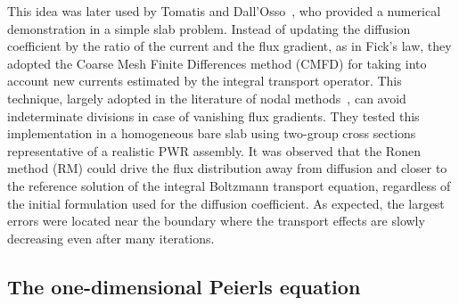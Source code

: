 This idea was later used by Tomatis and Dall'Osso~\cite{Tomatis-2011}, who provided a numerical demonstration in a simple slab problem. Instead of updating the diffusion coefficient by the ratio of the current and the flux gradient, as in Fick's law, they adopted the Coarse Mesh Finite Differences method (CMFD) for taking into account \DIFdelbegin {}\DIFdelend \DIFaddbegin {}\DIFaddend new currents estimated by the integral transport operator\DIFdelbegin {}\DIFdelend . 
%
%
This technique, largely adopted in the literature of nodal methods~\cite{Smith-1983,Lawrence-1986}, can avoid indeterminate divisions in case of vanishing flux gradients. They tested this implementation in a homogeneous bare slab using two-group cross sections representative of a realistic PWR assembly. It was observed that the Ronen method (RM) could drive the flux distribution away from diffusion and closer to the reference solution of the integral Boltzmann transport equation, regardless of the initial formulation used for the diffusion coefficient. As expected, the largest errors were located near the boundary \DIFdelbegin \DIFdel{, }\DIFdelend where the transport effects are \DIFdelbegin {}\DIFdelend \DIFaddbegin {}\DIFaddend slowly decreasing even after many iterations.%

%
\subsection{The one-dimensional Peierls equation}
\label{sec:Peierls}

